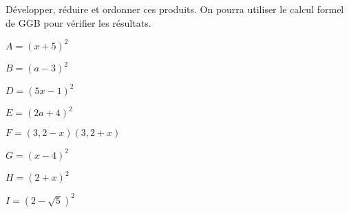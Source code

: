 
Développer, réduire et ordonner ces produits. On pourra utiliser le calcul formel de GGB pour vérifier les résultats.

\begin{minipage}{5cm}
\begin{description}
\item $A=(x+5)^2$
\item $B=(a-3)^2$
\end{description}
\end{minipage}
\begin{minipage}{5cm}
\begin{description}
\item $D=(5x-1)^2$
\item $E=(2a+4)^2$
\end{description}
\end{minipage}
\begin{minipage}{5cm}
\begin{description}
\item $F=(3,2-x)(3,2+x)$
\item $G=(x-4)^2$
\end{description}
\end{minipage}
\begin{minipage}{5cm}
\begin{description}
\item $H=(2+x)^2$
\item $I=(2-\sqrt{5})^2$
\end{description}
\end{minipage}